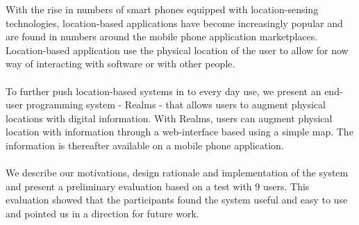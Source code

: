 With the rise in numbers of smart phones equipped with location-sensing technologies, location-based applications have become increasingly popular and are found in numbers around the mobile phone application marketplaces. Location-based application use the physical location of the user to allow for now way of interacting with software or with other people.
\\\\
To further push location-based systems in to every day use, we present an end-user programming system - Realms - that allows users to augment physical locations with digital information. With Realms, users can augment physical location with information through a web-interface based using a simple map. The information is thereafter available on a mobile phone application.
\\\\
We describe our motivations, design rationale and implementation of the system and present a preliminary evaluation based on a test with 9 users. This evaluation showed that the participants found the system useful and easy to use and pointed us in a direction for future work.